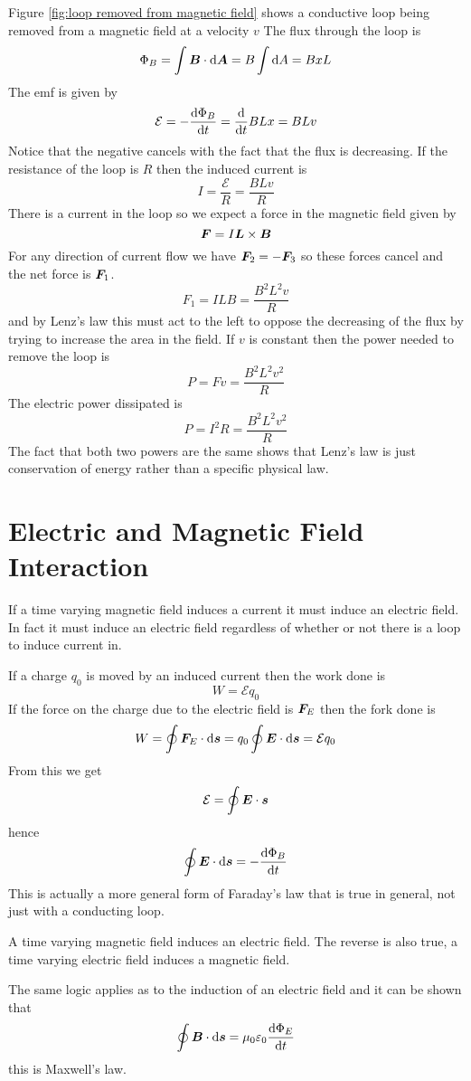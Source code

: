 \documentclass{article}
\newcommand{\emf}{\mathcal{E}}
\begin{document}
    Figure \ref{fig:loop removed from magnetic field} shows a conductive loop being removed from a magnetic field at a velocity \(v\)
    The flux through the loop is
    \[\Phi_B = \int\bm{B}\cdot\dd\bm{A} = B\int\dd A = BxL\]
    The emf is given by
    \[\emf = -\dv{\Phi_B}{t} = \dv{t}BLx = BLv\]
    Notice that the negative cancels with the fact that the flux is decreasing.
    If the resistance of the loop is \(R\) then the induced current is
    \[I = \frac{\emf}{R} = \frac{BLv}{R}\]
    There is a current in the loop so we expect a force in the magnetic field given by
    \[\bm{F} = I\bm{L}\times\bm{B}\]
    For any direction of current flow we have \(\bm{F}_2 = -\bm{F}_3\) so these forces cancel and the net force is \(\bm{F}_1\).
    \[F_1 = ILB = \frac{B^2L^2v}{R}\]
    and by Lenz's law this must act to the left to oppose the decreasing of the flux by trying to increase the area in the field.
    If \(v\) is constant then the power needed to remove the loop is
    \[P = Fv = \frac{B^2L^2v^2}{R}\]
    The electric power dissipated is
    \[P = I^2R = \frac{B^2L^2v^2}{R}\]
    The fact that both two powers are the same shows that Lenz's law is just conservation of energy rather than a specific physical law.
    
    \section{Electric and Magnetic Field Interaction}
    If a time varying magnetic field induces a current it must induce an electric field.
    In fact it must induce an electric field regardless of whether or not there is a loop to induce current in.
    
    If a charge \(q_0\) is moved by an induced current then the work done is
    \[W = \emf q_0\]
    If the force on the charge due to the electric field is \(\bm{F}_E\) then the fork done is
    \[W = \oint\vv F_E\cdot\dd\vv s = q_0\oint\vv E\cdot\dd\vv s = \emf q_0\]
    From this we get
    \[\emf = \oint\vv E\cdot\vv s\]
    hence
    \[\oint\bm{E}\cdot\dd\bm{s} = -\dv{\Phi_B}{t}\]
    This is actually a more general form of Faraday's law that is true in general, not just with a conducting loop.
    
    A time varying magnetic field induces an electric field.
    The reverse is also true, a time varying electric field induces a magnetic field.
    
    The same logic applies as to the induction of an electric field and it can be shown that
    \[\oint\bm{B}\cdot\dd\bm{s} = \mu_0\varepsilon_0\dv{\Phi_E}{t}\]
    this is Maxwell's law.
    
\end{document}
